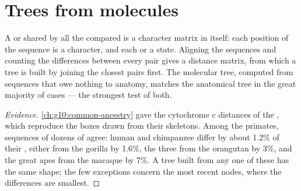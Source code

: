 \section{Trees from molecules}

\begin{proposition}\label{prop:g12:phylogenetic-trees:molecular}
A  or  shared by all the  compared is a character
matrix in itself: each position of the sequence is a character, and
each  or  a state. Aligning the sequences and
counting the differences between every pair gives a distance matrix,
from which a tree is built by joining the closest pairs first. The
molecular tree, computed from sequences that owe nothing to anatomy,
matches the anatomical tree in the great majority of cases --- the
strongest test of both.
\end{proposition}
\begin{proof}[Evidence]
\cref{ch:g10:common-ancestry} gave the cytochrome c distances of the
, which reproduce the boxes drawn from their skeletons.
Among the primates, sequences of dozens of  agree: human and
chimpanzee differ by about 1.2\% of their , either from the gorilla
by 1.6\%, the three from the orangutan by 3\%, and the great apes from
the macaque by 7\%. A tree built from any one of these  has the
same shape; the few exceptions concern the most recent nodes, where
the differences are smallest.
\end{proof}

